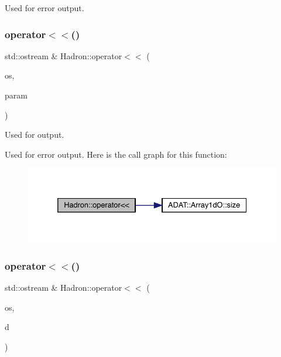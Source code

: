 Used for error output. 

\mbox{\label{namespaceHadron_a815bc759a8acf71f5194f582a963f3f7}} 
\subsubsection{\texorpdfstring{operator$<$$<$()}{operator<<()}\hspace{0.1cm}{\footnotesize\ttfamily [23/48]}}
{\footnotesize\ttfamily std\+::ostream \& Hadron\+::operator$<$$<$ (\begin{DoxyParamCaption}\item[{std\+::ostream \&}]{os,  }\item[{const \mbox{\hyperlink{classADAT_1_1Array1dO}{Array1dO}}$<$ \mbox{\hyperlink{structHadron_1_1KeyParticleOp__t}{Key\+Particle\+Op\+\_\+t}} $>$ \&}]{param }\end{DoxyParamCaption})}



Used for output. 

Used for error output. Here is the call graph for this function\+:\nopagebreak
\begin{figure}[H]
\begin{center}
\leavevmode
\includegraphics[width=332pt]{d1/daf/namespaceHadron_a815bc759a8acf71f5194f582a963f3f7_cgraph}
\end{center}
\end{figure}
\mbox{\label{namespaceHadron_a6bcf2658e0321428eeedf53a15a894aa}} 
\subsubsection{\texorpdfstring{operator$<$$<$()}{operator<<()}\hspace{0.1cm}{\footnotesize\ttfamily [24/48]}}
{\footnotesize\ttfamily std\+::ostream \& Hadron\+::operator$<$$<$ (\begin{DoxyParamCaption}\item[{std\+::ostream \&}]{os,  }\item[{const \mbox{\hyperlink{structHadron_1_1KeyGenPropElementalOperator__t}{Key\+Gen\+Prop\+Elemental\+Operator\+\_\+t}} \&}]{d }\end{DoxyParamCaption})}




